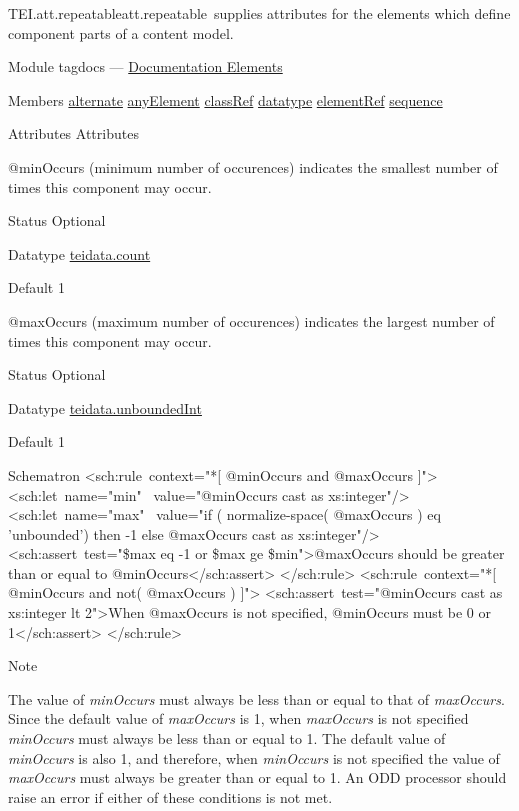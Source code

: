 \begin{reflist}
\item[]\begin{specHead}{TEI.att.repeatable}{att.repeatable} supplies attributes for the elements which define component parts of a content model.\end{specHead} 
    \item[{Module}]
  tagdocs — \hyperref[TD]{Documentation Elements}
    \item[{Members}]
  \hyperref[TEI.alternate]{alternate} \hyperref[TEI.anyElement]{anyElement} \hyperref[TEI.classRef]{classRef} \hyperref[TEI.datatype]{datatype} \hyperref[TEI.elementRef]{elementRef} \hyperref[TEI.sequence]{sequence}
    \item[{Attributes}]
  Attributes\hfil\\[-10pt]\begin{sansreflist}
    \item[@minOccurs]
  (minimum number of occurences) indicates the smallest number of times this component may occur.
\begin{reflist}
    \item[{Status}]
  Optional
    \item[{Datatype}]
  \hyperref[TEI.teidata.count]{teidata.count}
    \item[{Default}]
  1
\end{reflist}  
    \item[@maxOccurs]
  (maximum number of occurences) indicates the largest number of times this component may occur.
\begin{reflist}
    \item[{Status}]
  Optional
    \item[{Datatype}]
  \hyperref[TEI.teidata.unboundedInt]{teidata.unboundedInt}
    \item[{Default}]
  1
\end{reflist}  
\end{sansreflist}  
    \item[{Schematron}]
   <sch:rule context="*[ @minOccurs and @maxOccurs ]"> <sch:let name="min"  value="@minOccurs cast as xs:integer"/> <sch:let name="max"  value="if ( normalize-space( @maxOccurs ) eq 'unbounded') then -1 else @maxOccurs   cast as xs:integer"/> <sch:assert test="\$max eq -1 or \$max ge \$min">@maxOccurs should be greater than or equal to @minOccurs</sch:assert> </sch:rule> <sch:rule context="*[ @minOccurs and not( @maxOccurs ) ]"> <sch:assert test="@minOccurs cast as xs:integer lt 2">When @maxOccurs is not specified, @minOccurs must be 0 or 1</sch:assert> </sch:rule>
    \item[{Note}]
  \par
The value of {\itshape minOccurs} must always be less than or equal to that of {\itshape maxOccurs}. Since the default value of {\itshape maxOccurs} is 1, when {\itshape maxOccurs} is not specified {\itshape minOccurs} must always be less than or equal to 1. The default value of {\itshape minOccurs} is also 1, and therefore, when {\itshape minOccurs} is not specified the value of {\itshape maxOccurs} must always be greater than or equal to 1. An ODD processor should raise an error if either of these conditions is not met.
\end{reflist}  
